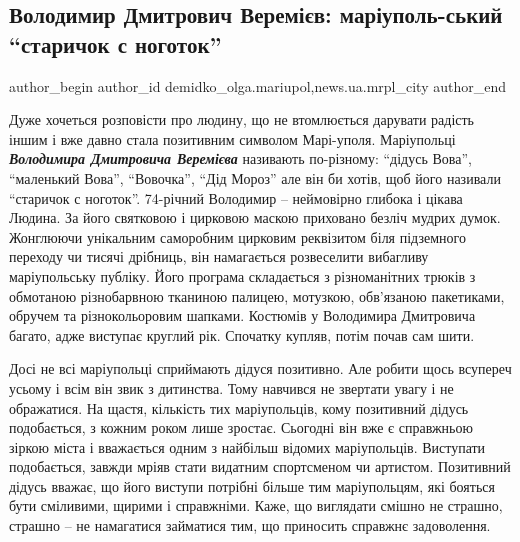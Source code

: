  
 
 
 
 
 
\subsection{Володимир Дмитрович Веремієв: маріуполь\hyp{}ський \enquote{старичок с ноготок}}
\label{sec:16_06_2020.stz.news.ua.mrpl_city.1.volodymyr_dmytrovych_veremiev_starichok_s_nogotok}
 
\ifcmt
 author_begin
   author_id demidko_olga.mariupol,news.ua.mrpl_city
 author_end
\fi


Дуже хочеться розповісти про людину, що не втомлюється дарувати радість іншим і
вже давно стала позитивним символом Марі\hyp{}уполя. Маріупольці \emph{\textbf{Володимира
Дмитровича Веремієва}} називають по-різному: \enquote{дідусь Вова}, \enquote{маленький Вова},
\enquote{Вовочка}, \enquote{Дід Мороз} але він би хотів, щоб його називали \enquote{старичок с
ноготок}. 74-річний Володимир – неймовірно глибока і цікава Людина. За його
святковою і цирковою маскою приховано безліч мудрих думок. Жонглюючи унікальним
саморобним цирковим реквізитом біля підземного переходу чи тисячі дрібниць, він
намагається розвеселити вибагливу маріупольську публіку. Його програма
складається з різноманітних трюків з обмотаною різнобарвною тканиною палицею,
мотузкою, обв'язаною пакетиками, обручем та різнокольоровим шапками. Костюмів у
Володимира Дмитровича багато, адже виступає круглий рік. Спочатку купляв, потім
почав сам шити.

Досі не всі маріупольці сприймають дідуся позитивно. Але робити щось всупереч
усьому і всім він звик з дитинства. Тому навчився не звертати увагу і не
ображатися. На щастя, кількість тих маріупольців, кому позитивний дідусь
подобається, з кожним роком лише зростає. Сьогодні він вже є справжньою зіркою
міста і вважається одним з найбільш відомих маріупольців. Виступати
подобається, завжди мріяв стати видатним спортсменом чи артистом. Позитивний
дідусь вважає, що його виступи потрібні більше тим маріупольцям, які бояться
бути сміливими, щирими і справжніми. Каже, що виглядати смішно не страшно,
страшно – не намагатися займатися тим, що приносить справжнє задоволення.

